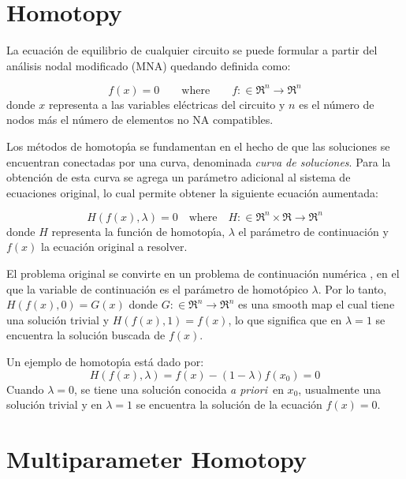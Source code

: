 \documentclass[conference,letterpaper,twocolumn]{IEEEtran}
\begin{document}
\section{Homotopy}


La ecuación de equilibrio de cualquier  circuito se puede formular
a partir del análisis nodal modificado (MNA) \cite{mnaxx}
quedando definida como:

\begin{equation}
{f}({x})={0} \qquad \text{where} \qquad f:\in \mathfrak{R}^n \to  \mathfrak{R}^n 
\label{fx}
\end{equation}
donde $x$ representa a las variables eléctricas del circuito y $n$ es el número de nodos más el número
de elementos no NA compatibles.

Los m\'etodos de homotop\'{\i}a se fundamentan en el hecho de
que las so\-lu\-cio\-nes se encuentran conectadas por una curva, denominada
\emph{curva de so\-lu\-cio\-nes}. 
Para la obtenci\'on de esta curva se agrega
un par\'ametro adicional al sistema de ecuaciones original, lo cual
permite obtener la siguiente ecuaci\'on aumentada:

{\small
\begin{equation}
{H}({f}({x}),\lambda )={0}  \quad \text{where} \quad {H}: \in \mathfrak{R}^n \times  \mathfrak{R} \to \mathfrak{R}^n
\label{homotopia}
\end{equation}}
donde ${H}$ representa la funci\'on de homotop\'{\i}a,
$\lambda$ el par\'ametro de continuaci\'on y
${f}({x})$ la ecuaci\'on original a resolver.

El problema original se convirte en un problema de continuación
num\'erica \cite{homo_richter}, en el que la variable de continuación es el par\'ametro de
homot\'opico $\lambda$. Por lo tanto, ${H}({f}({x}),0)={G}({x})$
donde ${G}: \in \mathfrak{R}^n \to  \mathfrak{R}^n$ es una smooth map el cual tiene una solución
trivial y ${H}({f}({x}),1)={f}({x})$, lo que significa que en $\lambda=1$ se encuentra la solución buscada de ${f}({x})$. 


Un ejemplo  de homotop\'{\i}a est\'a dado por:
\begin{equation}
{H}({f}({x}),\lambda ) =
{f}({x})-(1-\lambda ){f}({x}_{0}) = 0
\label{hexampl}
\end{equation}
Cuando $\lambda =0$, se tiene una soluci\'on conocida {\em a priori}\,
en ${x}_{0}$, usualmente una soluci\'on trivial y en $\lambda =1$ se encuentra la soluci\'on
de la ecuaci\'on ${f}({x})=0$. 

\section{Multiparameter Homotopy}
\end{document}
